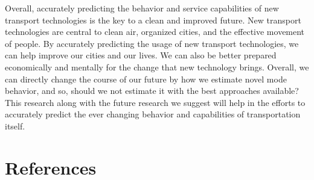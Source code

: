 \documentclass[fancy, masters]{byuthesis}
\begin{document}
Overall, accurately predicting the behavior and service capabilities of new transport technologies is the key to a clean and improved future. New transport technologies are central to clean air, organized cities, and the effective movement of people. By accurately predicting the usage of new transport technologies, we can help improve our cities and our lives. We can also be better prepared economically and mentally for the change that new technology brings. Overall, we can directly change the course of our future by how we estimate novel mode behavior, and so, should we not estimate it with the best approaches available? This research along with the future research we suggest will help in the efforts to accurately predict the ever changing behavior and capabilities of transportation itself.

\hypertarget{references}{%
\chapter*{References}\label{references}}
\end{document}
